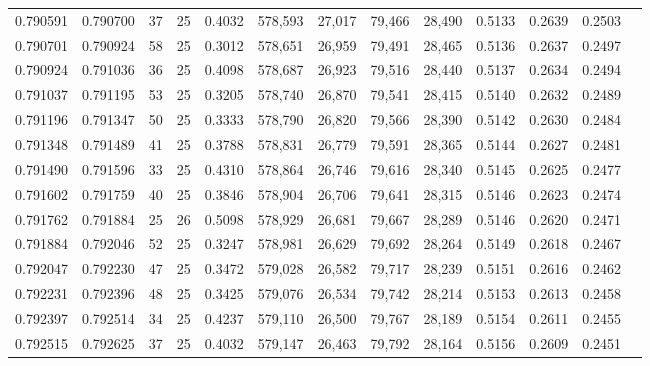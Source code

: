 \begin{tabular}{rrrrrrrrrrrrr}
0.790591 & 0.790700 &    37 &  25 &                                     0.4032 & 578,593 &  27,017 &  79,466 &  28,490 & 0.5133 & 0.2639 & 0.2503 \\
0.790701 & 0.790924 &    58 &  25 &                                     0.3012 & 578,651 &  26,959 &  79,491 &  28,465 & 0.5136 & 0.2637 & 0.2497 \\
0.790924 & 0.791036 &    36 &  25 &                                     0.4098 & 578,687 &  26,923 &  79,516 &  28,440 & 0.5137 & 0.2634 & 0.2494 \\
0.791037 & 0.791195 &    53 &  25 &                                     0.3205 & 578,740 &  26,870 &  79,541 &  28,415 & 0.5140 & 0.2632 & 0.2489 \\
0.791196 & 0.791347 &    50 &  25 &                                     0.3333 & 578,790 &  26,820 &  79,566 &  28,390 & 0.5142 & 0.2630 & 0.2484 \\
0.791348 & 0.791489 &    41 &  25 &                                     0.3788 & 578,831 &  26,779 &  79,591 &  28,365 & 0.5144 & 0.2627 & 0.2481 \\
0.791490 & 0.791596 &    33 &  25 &                                     0.4310 & 578,864 &  26,746 &  79,616 &  28,340 & 0.5145 & 0.2625 & 0.2477 \\
0.791602 & 0.791759 &    40 &  25 &                                     0.3846 & 578,904 &  26,706 &  79,641 &  28,315 & 0.5146 & 0.2623 & 0.2474 \\
0.791762 & 0.791884 &    25 &  26 &                                     0.5098 & 578,929 &  26,681 &  79,667 &  28,289 & 0.5146 & 0.2620 & 0.2471 \\
0.791884 & 0.792046 &    52 &  25 &                                     0.3247 & 578,981 &  26,629 &  79,692 &  28,264 & 0.5149 & 0.2618 & 0.2467 \\
0.792047 & 0.792230 &    47 &  25 &                                     0.3472 & 579,028 &  26,582 &  79,717 &  28,239 & 0.5151 & 0.2616 & 0.2462 \\
0.792231 & 0.792396 &    48 &  25 &                                     0.3425 & 579,076 &  26,534 &  79,742 &  28,214 & 0.5153 & 0.2613 & 0.2458 \\
0.792397 & 0.792514 &    34 &  25 &                                     0.4237 & 579,110 &  26,500 &  79,767 &  28,189 & 0.5154 & 0.2611 & 0.2455 \\
0.792515 & 0.792625 &    37 &  25 &                                     0.4032 & 579,147 &  26,463 &  79,792 &  28,164 & 0.5156 & 0.2609 & 0.2451 \\

\end{tabular}
